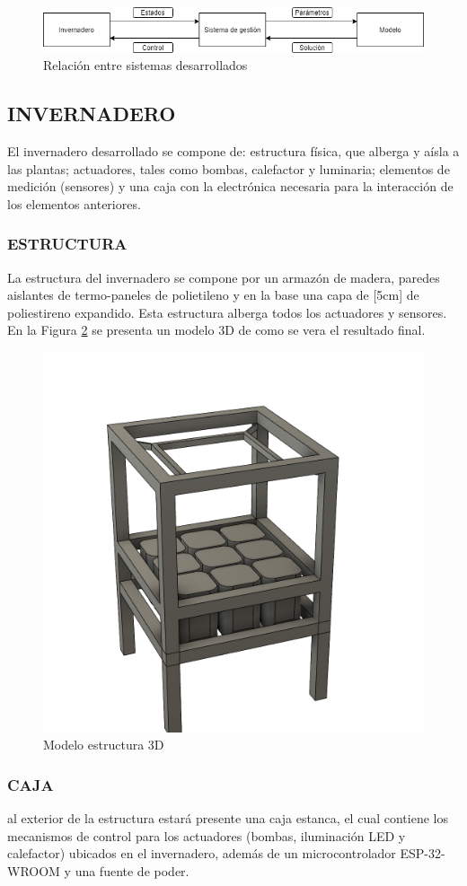 \documentclass[letterpaper,conference]{IEEEtran}
\begin{document}
		\begin{figure}[ht]
			\centering
				\includegraphics[width=\linewidth]{imagenes/Sistemas.png} 
			\caption{Relación entre sistemas desarrollados}
			\label{fig:sistemas}
		\end{figure}

	\subsection{INVERNADERO}
		El invernadero desarrollado se compone de: estructura física, que alberga y aísla a las plantas; actuadores, tales como bombas, calefactor y luminaria; elementos de medición (sensores) y una caja con la electrónica necesaria para la interacción de los elementos anteriores.
		
		
		\subsubsection{ESTRUCTURA}
			La estructura del invernadero se compone por un armazón de madera, paredes aislantes de termo-paneles de polietileno y en la base una capa de [5cm] de poliestireno expandido. Esta estructura alberga todos los actuadores y sensores. En la Figura \ref{fig:maqueta} se presenta un modelo 3D de como se vera el resultado final.
			\begin{figure}[h]%
				\centering
				\includegraphics[width=0.35\linewidth]{imagenes/cajon3d.png}%
				\caption{Modelo estructura 3D}
				\label{fig:maqueta}%
			\end{figure}%

		\subsubsection{CAJA}
		
			al exterior de la estructura estará presente una caja estanca, el cual contiene los mecanismos de control para los actuadores (bombas, iluminación LED y calefactor) ubicados en el invernadero, además de un microcontrolador ESP-32-WROOM y una fuente de poder.
\end{document}
